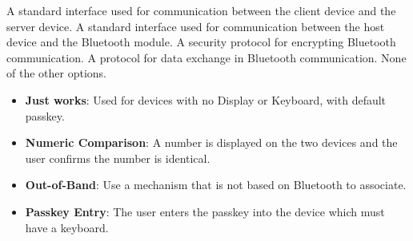 \begin{checkboxes}
    \choice A standard interface used for communication between the client device and the server device.
    \CorrectChoice A standard interface used for communication between the host device and the Bluetooth module.
    \choice A security protocol for encrypting Bluetooth communication.
    \choice A protocol for data exchange in Bluetooth communication.
    \choice None of the other options.
\end{checkboxes}

\begin{solution}
    \begin{itemize}
        \item \textbf{Just works}: Used for devices with no Display or Keyboard, with default passkey.
        \item \textbf{Numeric Comparison}: A number is displayed on the two devices and the user confirms the number is identical.
        \item \textbf{Out-of-Band}: Use a mechanism that is not based on Bluetooth to associate.
        \item \textbf{Passkey Entry}: The user enters the passkey into the device which must have a keyboard.
    \end{itemize}
\end{solution}